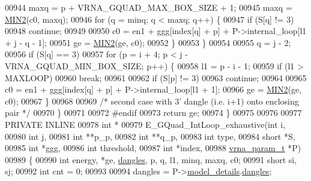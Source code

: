 \begin{DoxyCode}
00944       maxq  = p + VRNA\_GQUAD\_MAX\_BOX\_SIZE + 1;
00945       maxq  = \hyperlink{group__utils_gae0b9cd0ce090bd69b951aa73e8fa4f7d}{MIN2}(c0, maxq);
00946       \textcolor{keywordflow}{for} (q = minq; q < maxq; q++) \{
00947         \textcolor{keywordflow}{if} (S[q] != 3)
00948           \textcolor{keywordflow}{continue};
00949 
00950         c0  = en1 + ggg[index[q] + p] + P->internal\_loop[l1 + j - q - 1];
00951         ge  = \hyperlink{group__utils_gae0b9cd0ce090bd69b951aa73e8fa4f7d}{MIN2}(ge, c0);
00952       \}
00953     \}
00954 
00955     q = j - 2;
00956     \textcolor{keywordflow}{if} (S[q] == 3)
00957       \textcolor{keywordflow}{for} (p = i + 4; p < j - VRNA\_GQUAD\_MIN\_BOX\_SIZE; p++) \{
00958         l1 = p - i - 1;
00959         \textcolor{keywordflow}{if} (l1 > MAXLOOP)
00960           \textcolor{keywordflow}{break};
00961 
00962         \textcolor{keywordflow}{if} (S[p] != 3)
00963           \textcolor{keywordflow}{continue};
00964 
00965         c0  = en1 + ggg[index[q] + p] + P->internal\_loop[l1 + 1];
00966         ge  = \hyperlink{group__utils_gae0b9cd0ce090bd69b951aa73e8fa4f7d}{MIN2}(ge, c0);
00967       \}
00968 
00969     \textcolor{comment}{/* second case with 3' dangle (i.e. i+1) onto enclosing pair */}
00970   \}
00971 
00972 \textcolor{preprocessor}{#endif}
00973   \textcolor{keywordflow}{return} ge;
00974 \}
00975 
00976 
00977 PRIVATE INLINE
00978 \textcolor{keywordtype}{int} *
00979 E\_GQuad\_IntLoop\_exhaustive(\textcolor{keywordtype}{int}          i,
00980                            \textcolor{keywordtype}{int}          j,
00981                            \textcolor{keywordtype}{int}          **p\_p,
00982                            \textcolor{keywordtype}{int}          **q\_p,
00983                            \textcolor{keywordtype}{int}          type,
00984                            \textcolor{keywordtype}{short}        *S,
00985                            \textcolor{keywordtype}{int}          *ggg,
00986                            \textcolor{keywordtype}{int}          threshold,
00987                            \textcolor{keywordtype}{int}          *index,
00988                            \hyperlink{group__energy__parameters_structvrna__param__s}{vrna\_param\_t} *P)
00989 \{
00990   \textcolor{keywordtype}{int}   energy, *ge, \hyperlink{group__model__details_ga72b511ed1201f7e23ec437e468790d74}{dangles}, p, q, l1, minq, maxq, c0;
00991   \textcolor{keywordtype}{short} si, sj;
00992   \textcolor{keywordtype}{int}   cnt = 0;
00993 
00994   dangles = P->\hyperlink{group__energy__parameters_a7b84353eb9075c595bad4ceb871bcae7}{model\_details}.\hyperlink{group__model__details_adcda4ff2ea77748ae0e8700288282efc}{dangles};

\end{DoxyCode}
